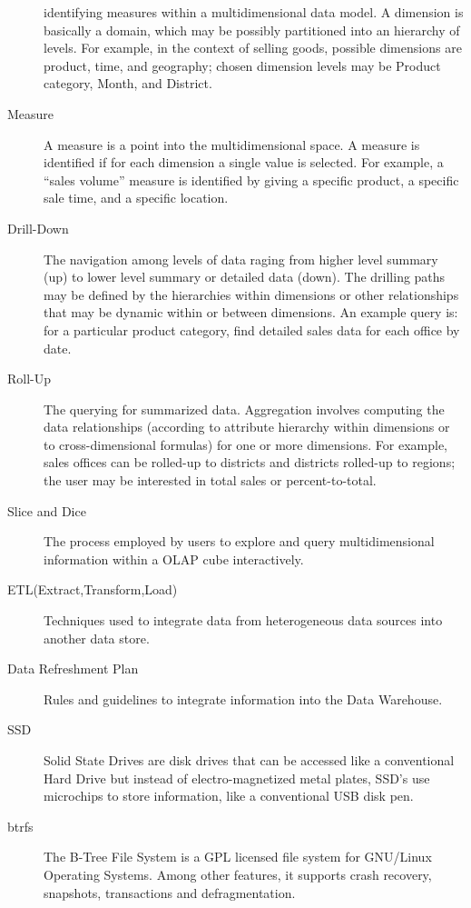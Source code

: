 \begin{description}
identifying measures within a multidimensional data model. 
A dimension is basically a domain, which may be possibly partitioned into an 
hierarchy of levels. For example, in the context of selling goods, possible 
dimensions are product, time, and geography; chosen dimension levels may be 
Product category, Month, and District.
\item[Measure] A measure is a point into the multidimensional space. A measure
is identified if for each dimension a single value is selected. For example, 
a “sales volume” measure is identified by giving a specific product, 
a specific sale time, and a specific location.
\item[Drill-Down] The navigation among levels of data raging from higher level
summary (up) to lower level summary or detailed data (down). The drilling paths 
may be defined by the hierarchies within dimensions or other relationships that 
may be dynamic within or between dimensions. An example query is: for a 
particular product category, find detailed sales data for each office by date.
\item[Roll-Up] The querying for summarized data. Aggregation involves
computing the data relationships (according to attribute hierarchy within 
dimensions or to cross-dimensional formulas) for one or more dimensions. 
For example, sales offices can be rolled-up to districts and districts 
rolled-up to regions; the user may be interested in total sales or 
percent-to-total.
\item[Slice and Dice] The process employed by users to explore and query
multidimensional information within a OLAP cube interactively.
\item[ETL(Extract,Transform,Load)] Techniques used to integrate data from
heterogeneous data sources into another data store.
\item[Data Refreshment Plan] Rules and guidelines to integrate information
into the Data Warehouse.
\item[SSD] Solid State Drives are disk drives that can be accessed like a
conventional Hard Drive but instead of electro-magnetized metal plates, SSD’s 
use microchips to store information, like a conventional USB disk pen.
\item[btrfs] The B-Tree File System is a GPL licensed file system for GNU/Linux
Operating Systems. Among other features, it supports crash recovery, snapshots,
transactions and defragmentation.
\end{description}